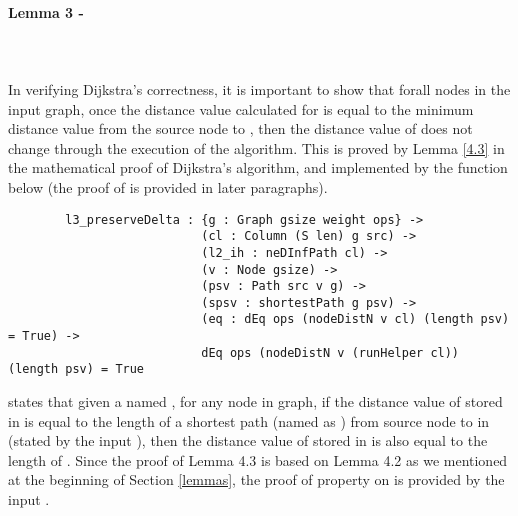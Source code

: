 \paragraph{Lemma 3 - }
\tab\\\\
In verifying Dijkstra's correctness, it is important to show that forall nodes  in the input graph, once the distance value calculated for  is equal to the minimum distance value from the source node to , then the distance value of  does not change through the execution of the algorithm. This is proved by Lemma \ref{4.3} in the mathematical proof of Dijkstra's algorithm, and implemented by the function  below (the proof of  is provided in later paragraphs). 
\begin{lstlisting}
		l3_preserveDelta : {g : Graph gsize weight ops} ->
		                   (cl : Column (S len) g src) ->
		                   (l2_ih : neDInfPath cl) ->
		                   (v : Node gsize) ->
		                   (psv : Path src v g) ->
		                   (spsv : shortestPath g psv) ->
		                   (eq : dEq ops (nodeDistN v cl) (length psv) = True) ->
		                   dEq ops (nodeDistN v (runHelper cl)) (length psv) = True
\end{lstlisting}

 states that given a  named , for any node  in graph, if the distance value of  stored in  is equal to the length of a shortest path (named as ) from source node  to  in  (stated by the input ), then the distance value of  stored in  is also equal to the length of . Since the proof of Lemma 4.3 is based on Lemma 4.2 as we mentioned at the beginning of Section \ref{lemmas}, the proof of property  on  is provided by the input . 
\\

